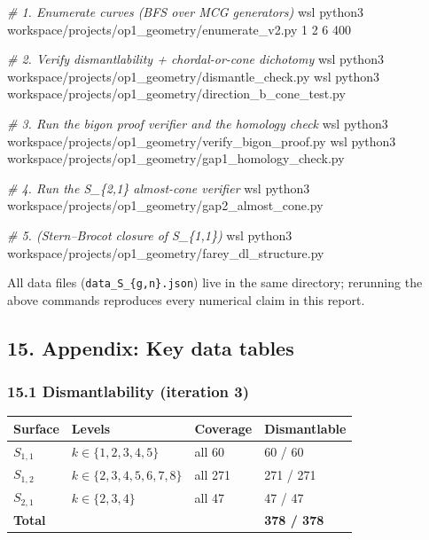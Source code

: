 \documentclass[
]{article}
\newenvironment{Shaded}{}{}
\newcommand{\CommentTok}[1]{\textcolor[rgb]{0.38,0.63,0.69}{\textit{#1}}}
\newcommand{\ExtensionTok}[1]{#1}
\newcommand{\NormalTok}[1]{#1}
\newcounter{none} %
\begin{document}
\begin{Shaded}
\begin{Highlighting}[]
\CommentTok{\# 1. Enumerate curves (BFS over MCG generators)}
\ExtensionTok{wsl}\NormalTok{ python3 workspace/projects/op1\_geometry/enumerate\_v2.py 1 2 6 400}

\CommentTok{\# 2. Verify dismantlability + chordal{-}or{-}cone dichotomy}
\ExtensionTok{wsl}\NormalTok{ python3 workspace/projects/op1\_geometry/dismantle\_check.py}
\ExtensionTok{wsl}\NormalTok{ python3 workspace/projects/op1\_geometry/direction\_b\_cone\_test.py}

\CommentTok{\# 3. Run the bigon proof verifier and the homology check}
\ExtensionTok{wsl}\NormalTok{ python3 workspace/projects/op1\_geometry/verify\_bigon\_proof.py}
\ExtensionTok{wsl}\NormalTok{ python3 workspace/projects/op1\_geometry/gap1\_homology\_check.py}

\CommentTok{\# 4. Run the S\_\{2,1\} almost{-}cone verifier}
\ExtensionTok{wsl}\NormalTok{ python3 workspace/projects/op1\_geometry/gap2\_almost\_cone.py}

\CommentTok{\# 5. (Stern–Brocot closure of S\_\{1,1\})}
\ExtensionTok{wsl}\NormalTok{ python3 workspace/projects/op1\_geometry/farey\_dl\_structure.py}
\end{Highlighting}
\end{Shaded}

All data files (\texttt{data\_S\_\{g,n\}.json}) live in the same
directory; rerunning the above commands reproduces every numerical claim
in this report.

\subsection{15. Appendix: Key data
tables}\label{appendix-key-data-tables}

\subsubsection{15.1 Dismantlability (iteration
3)}\label{dismantlability-iteration-3}

{\def\LTcaptype{none} %
\begin{longtable}[]{@{}llll@{}}
\toprule\noalign{}
Surface & Levels & Coverage & Dismantlable \\
\midrule\noalign{}
\endhead
\bottomrule\noalign{}
\endlastfoot
\(S_{1,1}\) & \(k \in \{1,2,3,4,5\}\) & all 60 & 60 / 60 \\
\(S_{1,2}\) & \(k \in \{2,3,4,5,6,7,8\}\) & all 271 & 271 / 271 \\
\(S_{2,1}\) & \(k \in \{2,3,4\}\) & all 47 & 47 / 47 \\
\textbf{Total} & & & \textbf{378 / 378} \\
\end{longtable}
}
\end{document}
